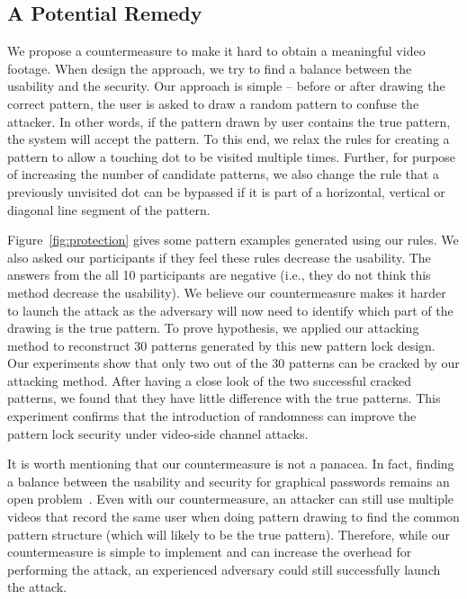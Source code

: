 
\subsection{A Potential Remedy}
\label{section: potential-remedy}
We propose a countermeasure to make it hard to obtain a meaningful video footage.
When design the approach, we try to find a balance between the usability and the security.
Our approach is simple --
before or after drawing the correct pattern, the user is asked to draw a random pattern to confuse the attacker. In
other words, if the pattern drawn by user contains the true pattern, the system will accept the pattern. To this
end, we relax the rules for creating a pattern to allow a touching dot to be visited multiple times. Further, for
purpose of increasing the number of candidate patterns, we also change the rule that a previously unvisited dot can be
bypassed if it is part of a horizontal, vertical or diagonal line segment of the pattern.


Figure~\ref{fig:protection} gives some pattern examples generated using our rules. We also asked our participants if they feel these rules decrease
the usability. The answers from the all 10 participants are negative (i.e., they do not think this method decrease the usability).
We believe our countermeasure makes it harder to launch the attack as the adversary will now need to
identify which part of the drawing is the true pattern.
To prove hypothesis, we applied our attacking method to reconstruct 30 patterns generated by this new pattern lock design.
Our experiments show that only two out of the 30 patterns can be cracked by our attacking method.
After having a close look of the two successful cracked patterns, we found that they have little difference with the true patterns.
This experiment confirms that the introduction of randomness can improve the pattern lock security under video-side channel attacks.

It is worth mentioning that our countermeasure is not a panacea. In fact, finding a balance between the
usability and security for graphical passwords remains an open problem~\cite{Abdullah2008Towards}.
Even with our countermeasure, an attacker can still use multiple videos that record the same user when doing pattern
drawing to find the common pattern structure (which will likely to be the true pattern). Therefore, while our
countermeasure is simple to implement and can increase the overhead for performing the attack, an experienced
adversary could still successfully launch the attack.


